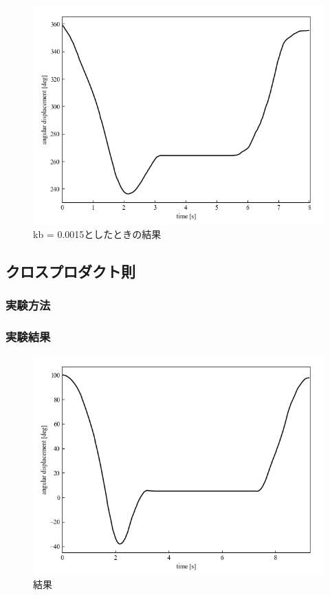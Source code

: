 \begin{figure}[H]
	\centering
		\includegraphics[scale=0.5]{./figure/15kb.png}
		\caption{kb = 0.0015としたときの結果}
		\label{fig:kb15}
\end{figure}

\newpage

\subsection{クロスプロダクト則}
\subsubsection{実験方法}
\subsubsection{実験結果}

\begin{figure}[H]
	\centering
		\includegraphics[scale=0.5]{./figure/cross.png}
		\caption{結果}
		\label{fig:cross}
\end{figure}

